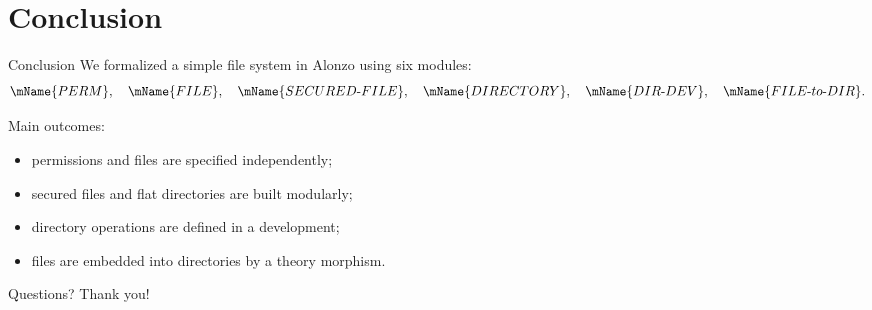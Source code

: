 \documentclass[aspectratio=169]{beamer}
\newcommand{\PERM}{\mName{PERM}}
\newcommand{\FILETYPE}{\mName{FILE}}
\newcommand{\SECFILE}{\mName{SECURED\text{-}FILE}}
\newcommand{\DIR}{\mName{DIRECTORY}}
\newcommand{\DIRDEV}{\mName{DIR\text{-}DEV}}
\begin{document}
\section{Conclusion}

\begin{frame}{Conclusion}
\small
We formalized a simple file system in Alonzo using six modules:
\[
\PERM,\quad
\FILETYPE,\quad
\SECFILE,\quad
\DIR,\quad
\DIRDEV,\quad
\mName{FILE\text{-}to\text{-}DIR}.
\]

\medskip
Main outcomes:
\begin{itemize}
  \item permissions and files are specified independently;
  \item secured files and flat directories are built modularly;
  \item directory operations are defined in a development;
  \item files are embedded into directories by a theory morphism.
\end{itemize}
\end{frame}

\begin{frame}{Questions?}
\centering
\Large Thank you!
\end{frame}
\end{document}
